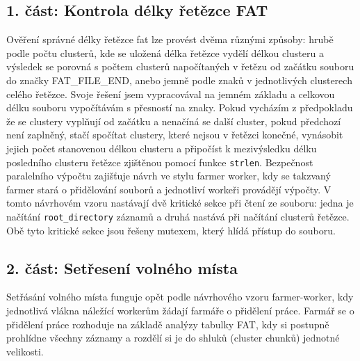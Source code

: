 \documentclass[12pt,a4paper]{article}
\begin{document}
\subsection{1. část: Kontrola délky řetězce FAT}
Ověření správné délky řetězce fat lze provést dvěma různými způsoby: hrubě podle počtu clusterů, kde se uložená délka řetězce vydělí délkou clusteru a výsledek se porovná s počtem clusterů napočítaných v řetězu od začátku souboru do značky FAT\_FILE\_END, anebo jemně podle znaků v jednotlivých clusterech celého řetězce. Svoje řešení jsem vypracovával na jemném základu a celkovou délku souboru vypočítávám s přesností na znaky. Pokud vycházím z předpokladu že se clustery vyplňují od začátku a nenačíná se další cluster, pokud předchozí není zaplněný, stačí spočítat clustery, které nejsou v řetězci konečné, vynásobit jejich počet stanovenou délkou clusteru a připočíst k mezivýsledku délku posledního clusteru řetězce zjištěnou pomocí funkce \texttt{strlen}.
Bezpečnost paralelního výpočtu zajišťuje návrh ve stylu farmer worker, kdy se takzvaný farmer stará o přidělování souborů a jednotliví workeři provádějí výpočty. V tomto návrhovém vzoru nastávají dvě kritické sekce při čtení ze souboru: jedna je načítání \texttt{root\_directory} záznamů a druhá nastává při načítání clusterů řetězce. Obě tyto kritické sekce jsou řešeny mutexem, který hlídá přístup do souboru.
\subsection{2. část: Setřesení volného místa}
Setřásání volného místa funguje opět podle návrhového vzoru farmer-worker, kdy jednotlivá vlákna náležící workerům žádají farmáře o přidělení práce. Farmář se o přidělení práce rozhoduje na základě analýzy tabulky FAT, kdy si postupně prohlídne všechny záznamy a rozdělí si je do shluků (cluster chunků) jednotné velikosti.
\end{document}
